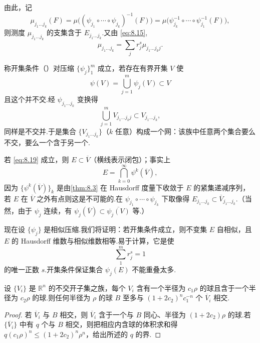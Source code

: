 由此，记
\[
  \mu_{j_1\ldots j_k}(F)=\mu\bigl((\psi_{j_1}\circ\cdots\circ\psi_{j_k})^{-1}(F)\bigr)
  =\mu\bigl(\psi_{j_k}^{-1}\circ\cdots\circ\psi_{j_1}^{-1}(F)\bigr),
\]
则测度 $\mu_{j_1\ldots j_k}$ 的支集含于 $E_{j_1\ldots j_k}$.又由 \eqref{eq:8.15},
\begin{equation}\label{eq:8.18}
  \mu_{j_1\ldots j_k}=\sum_{j}r_j^{s}\mu_{j_1\ldots j_k j}.
\end{equation}

称开集条件（）对压缩 $\{\psi_j\}_{1}^{m}$ 成立，若存在有界开集 $V$ 使
\begin{equation}\label{eq:8.19}
  \psi(V)=\bigcup_{j=1}^{m}\psi_j(V)\subset V
\end{equation}
且这个并不交.经 $\psi_{j_1\ldots j_k}$ 变换得
\[
  \bigcup_{j=1}^{m}V_{j_1\ldots j_k j}\subset V_{j_1\ldots j_k},
\]
同样是不交并.于是集合 $\{V_{j_1\ldots j_k}\}$（$k$ 任意）构成一个网：该族中任意两个集合要么不交，要么一个含于另一个.

若 \eqref{eq:8.19} 成立，则 $E\subset\overline{V}$（横线表示闭包）；事实上
\begin{equation}\label{eq:8.20}
  E=\bigcap_{k=0}^{\infty}\psi^{k}(\overline{V}),
\end{equation}
因为 $\{\psi^k(\overline{V})\}_k$ 是由\cref{thm:8.3} 在 Hausdorff 度量下收敛于 $E$ 的紧集递减序列，若 $E$ 在 $\overline{V}$ 之外有点则这是不可能的.在 $\psi_{j_1}\circ\cdots\circ\psi_{j_k}$ 下取像得 $E_{j_1\ldots j_k}\subset\overline{V}_{j_1\ldots j_k}$.（当然，由于 $\psi_j$ 连续，有 $\psi_j(\overline{V})\subset\overline{\psi_j(V)}$ 等.）

现在设 $\{\psi_j\}$ 是相似压缩.我们将证明：若开集条件成立，则不变集 $E$ 自相似，且 $E$ 的 Hausdorff 维数与相似维数相等.易于计算，它是使
\[
  \sum_{1}^{m}r_j^{s}=1
\]
的唯一正数 $s$.开集条件保证集合 $\psi_j(E)$ 不能重叠太多.

\begin{lemma}\label{lem:8.5}
设 $\{V_i\}$ 是 $\mathbb{R}^n$ 的不交开子集之族，每个 $V_i$ 含有一个半径为 $c_1\rho$ 的球且含于一个半径为 $c_2\rho$ 的球.则任何半径为 $\rho$ 的球 $B$ 至多与 $(1+2c_2)^n c_1^{-n}$ 个 $\overline{V}_i$ 相交.
\end{lemma}

\begin{proof}
若 $\overline{V}_i$ 与 $B$ 相交，则 $\overline{V}_i$ 含于一个与 $B$ 同心、半径为 $(1+2c_2)\rho$ 的球.若 $\{\overline{V}_i\}$ 中有 $q$ 个与 $B$ 相交，则把相应内含球的体积求和得 $q(c_1\rho)^n\leq(1+2c_2)^n\rho^n$，给出所述的 $q$ 的界.
\end{proof}

